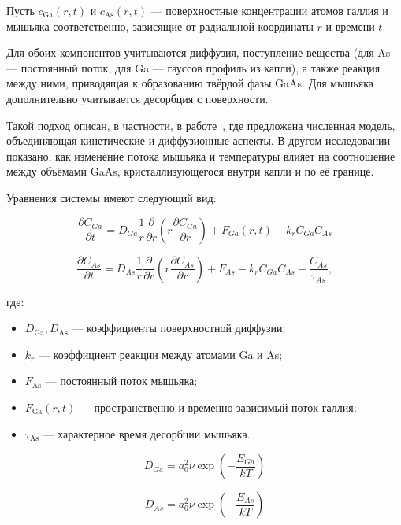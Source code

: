 \documentclass[14pt,oneside]{extarticle}
\begin{document}
Пусть $c_{\text{Ga}}(r,t)$ и $c_{\text{As}}(r,t)$ — поверхностные концентрации атомов галлия и мышьяка соответственно, зависящие от радиальной координаты $r$ и времени $t$.

Для обоих компонентов учитываются диффузия, поступление вещества (для As — постоянный поток, для Ga — гауссов профиль из капли), а также реакция между ними, приводящая к образованию твёрдой фазы GaAs. Для мышьяка дополнительно учитывается десорбция с поверхности.

Такой подход описан, в частности, в работе~\cite{reyes2013_1}, где предложена численная модель, объединяющая кинетические и диффузионные аспекты. В другом исследовании~\cite{bietti2020} показано, как изменение потока мышьяка и температуры влияет на соотношение между объёмами GaAs, кристаллизующегося внутри капли и по её границе.

Уравнения системы имеют следующий вид:

\begin{equation}
\frac{\partial C_{Ga}}{\partial t}=D_{Ga}\frac{1}{r}\frac{\partial}{\partial r}\left(r\frac{\partial C_{Ga}}{\partial r}\right)+F_{Ga}\left(r,t\right)-k_{r}C_{Ga}C_{As}
\label{eq:ga_diff}
\end{equation}

\begin{equation}
\frac{\partial C_{As}}{\partial t}=D_{As}\frac{1}{r}\frac{\partial}{\partial r}\left(r\frac{\partial C_{As}}{\partial r}\right)+F_{As}-k_{r}C_{Ga}C_{As}-\frac{C_{As}}{\tau_{As}},
\label{eq:as_diff}
\end{equation}

где:
\begin{itemize}
  \item $D_{\text{Ga}}, D_{\text{As}}$ — коэффициенты поверхностной диффузии;
  \item $k_{r}$ — коэффициент реакции между атомами Ga и As;
  \item $F_{\text{As}}$ — постоянный поток мышьяка;
  \item $F_{\text{Ga}}(r,t)$ — пространственно и временно зависимый поток галлия;
  \item $\tau_{\text{As}}$ — характерное время десорбции мышьяка.
\end{itemize}

\begin{equation}
D_{Ga}=a_{0}^{2}\nu\exp\left(-\frac{E_{Ga}}{kT}\right)
\end{equation}

\begin{equation}
D_{As}=a_{0}^{2}\nu\exp\left(-\frac{E_{As}}{kT}\right)
\end{equation}
\end{document}
